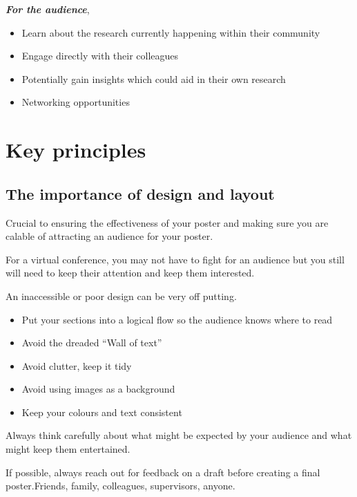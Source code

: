 \documentclass[
  titlepage]{book}
\providecommand{\tightlist}{%
  \setlength{\itemsep}{0pt}\setlength{\parskip}{0pt}}
\begin{document}
\textbf{\emph{For the audience}},

\begin{itemize}
\tightlist
\item
  Learn about the research currently happening within their community
\item
  Engage directly with their colleagues
\item
  Potentially gain insights which could aid in their own research
\item
  Networking opportunities
\end{itemize}

\hypertarget{key-principles}{%
\section{Key principles}\label{key-principles}}

\hypertarget{the-importance-of-design-and-layout}{%
\subsection{The importance of design and layout}\label{the-importance-of-design-and-layout}}

Crucial to ensuring the effectiveness of your poster and making sure you are calable of attracting an audience for your poster.

For a virtual conference, you may not have to fight for an audience but you still will need to keep their attention and keep them interested.

An inaccessible or poor design can be very off putting.

\begin{itemize}
\tightlist
\item
  Put your sections into a logical flow so the audience knows where to read
\item
  Avoid the dreaded ``Wall of text''
\item
  Avoid clutter, keep it tidy
\item
  Avoid using images as a background
\item
  Keep your colours and text consistent
\end{itemize}

Always think carefully about what might be expected by your audience and what might keep them entertained.

If possible, always reach out for feedback on a draft before creating a final poster.Friends, family, colleagues, supervisors, anyone.
\end{document}
